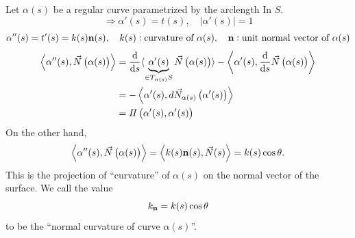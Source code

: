     Let \(\alpha(s)\) be a regular curve parametrized by the arclength In
    \(S\). 
    \[
        \Rightarrow \alpha'(s)=t(s),\quad \left|\alpha'(s)\right|=1
    \]
    \[
        \alpha''(s)=t'(s)=k(s)\vb{n}(s),\quad k(s):\text{curvature of
        }\alpha(s),\quad \vb{n}:\text{unit normal vector of }\alpha(s)
    \]
\begin{align*}
    \left\langle\alpha''(s),\vec{N}\left(\alpha(s)\right)\right\rangle
    &=\dv{s}\langle\underbrace{\alpha'(s)}_{\in T_{\alpha(s)}S}
    \vec{N}\left(\alpha(s)\right)\rangle-\left\langle
        \alpha'(s),\dv{s}\vec{N}\left(\alpha(s)\right)
    \right\rangle\\
    &=-\left\langle\alpha'(s),d\vec{N}_{\alpha(s)}\left(\alpha'(s)
    \right)\right\rangle\\
    &=I\!I\left(\alpha'(s),\alpha'(s)\right)
\end{align*}
On the other hand, 
\[
    \left\langle\alpha''(s),\vec{N}\left(\alpha(s)\right)\right\rangle    
    =\left\langle k(s) \vb{n}(s),\vec{N}(s)\right\rangle
    =k(s)\cos \theta.
\]
This is the projection of ``curvature'' of \(\alpha(s)\) on the normal
vector of the surface. We call the value
\[
    k_{\vb{n}}=k(s)\cos \theta
\]
to be the ``normal curvature of curve \(\alpha(s)\)''.

